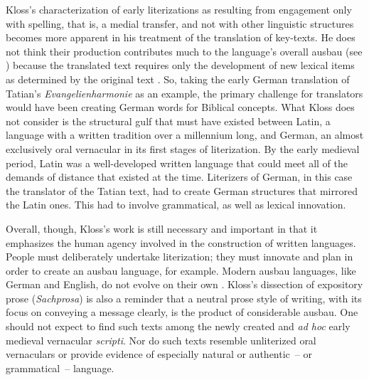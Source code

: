 Kloss’s characterization of early literizations as resulting from engagement only with spelling, that is, a medial transfer, and not with other linguistic structures becomes more apparent in his treatment of the translation of key-texts. He does not think their production contributes much to the language’s overall ausbau (see ) because the translated text requires only the development of new lexical items as determined by the original text \citep[39]{Kloss1978}. So, taking the early German translation of Tatian’s \textit{Evangelienharmonie} as an example, the primary challenge for translators would have been creating German words for Biblical concepts. What Kloss does not consider is the structural gulf that must have existed between Latin, a language with a written tradition over a millennium long, and German, an almost exclusively oral vernacular in its first stages of literization. By the early medieval period, Latin was a well-developed written language that could meet all of the demands of distance that existed at the time. Literizers of German, in this case the translator of the Tatian text, had to create German structures that mirrored the Latin ones. This had to involve grammatical, as well as lexical innovation.

Overall, though, Kloss’s work is still necessary and important in that it emphasizes the human agency involved in the construction of written languages. People must deliberately undertake literization; they must innovate and plan in order to create an ausbau language, for example. Modern ausbau languages, like German and English, do not evolve on their own \citep[38]{Kloss1967}. Kloss’s dissection of expository prose (\textit{Sachprosa}) is also a reminder that a neutral prose style of writing, with its focus on conveying a message clearly, is the product of considerable ausbau. One should not expect to find such texts among the newly created and \textit{ad hoc} early medieval vernacular \textit{scripti}. Nor do such texts resemble unliterized oral vernaculars or provide evidence of especially natural or authentic~-- or grammatical~-- language.

